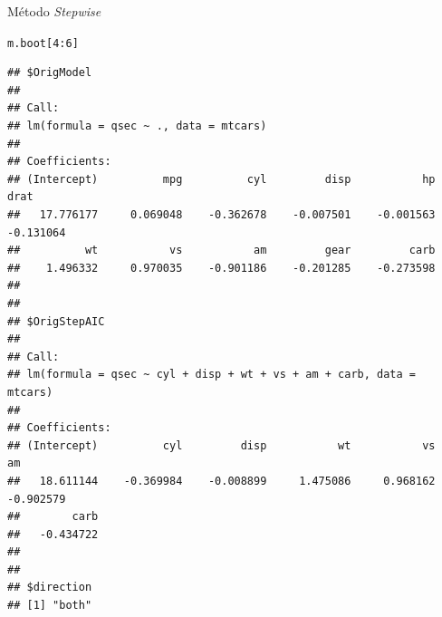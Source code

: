 \documentclass{beamer}\usepackage[]{graphicx}\usepackage[]{color}
\makeatletter
\newcommand{\hlnum}[1]{\textcolor[rgb]{0.686,0.059,0.569}{#1}}%
\newcommand{\hlopt}[1]{\textcolor[rgb]{0,0,0}{#1}}%
\newcommand{\hlstd}[1]{\textcolor[rgb]{0.345,0.345,0.345}{#1}}%
\newenvironment{kframe}{%
 \def\at@end@of@kframe{}%
 \ifinner\ifhmode%
  \def\at@end@of@kframe{\end{minipage}}%
  \begin{minipage}{\columnwidth}%
 \fi\fi%
 \def\FrameCommand##1{\hskip\@totalleftmargin \hskip-\fboxsep
 \colorbox{shadecolor}{##1}\hskip-\fboxsep
     \hskip-\linewidth \hskip-\@totalleftmargin \hskip\columnwidth}%
 \MakeFramed {\advance\hsize-\width
   \@totalleftmargin\z@ \linewidth\hsize
   \@setminipage}}%
 {\par\unskip\endMakeFramed%
 \at@end@of@kframe}
\newenvironment{knitrout}{}{} %
\renewenvironment{knitrout}{\setlength{\topsep}{0mm}}{}
\makeatother
\begin{document}
\begin{frame}[fragile]{Método \emph{Stepwise}}

\begin{knitrout}\tiny
{}\color{fgcolor}\begin{kframe}
\begin{alltt}
\hlstd{m.boot[}\hlnum{4}\hlopt{:}\hlnum{6}\hlstd{]}
\end{alltt}
\begin{verbatim}
## $OrigModel
## 
## Call:
## lm(formula = qsec ~ ., data = mtcars)
## 
## Coefficients:
## (Intercept)          mpg          cyl         disp           hp         drat  
##   17.776177     0.069048    -0.362678    -0.007501    -0.001563    -0.131064  
##          wt           vs           am         gear         carb  
##    1.496332     0.970035    -0.901186    -0.201285    -0.273598  
## 
## 
## $OrigStepAIC
## 
## Call:
## lm(formula = qsec ~ cyl + disp + wt + vs + am + carb, data = mtcars)
## 
## Coefficients:
## (Intercept)          cyl         disp           wt           vs           am  
##   18.611144    -0.369984    -0.008899     1.475086     0.968162    -0.902579  
##        carb  
##   -0.434722  
## 
## 
## $direction
## [1] "both"
\end{verbatim}
\end{kframe}
\end{knitrout}

\end{frame}
\end{document}
